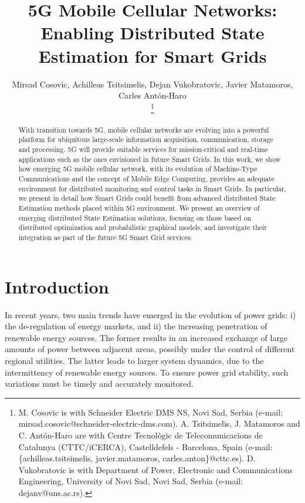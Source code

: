 \documentclass[journal]{IEEEtran}
\begin{document}
\title{5G Mobile Cellular Networks: Enabling Distributed State Estimation for Smart Grids}

\author{Mirsad Cosovic,
		Achilleas Tsitsimelis,
        Dejan Vukobratovic,
        Javier Matamoros,
       	Carles Ant\'on-Haro%
       	
\thanks{M. Cosovic is with Schneider Electric DMS NS, Novi Sad, Serbia (e-mail: mirsad.cosovic@schneider-electric-dms.com).  A. Tsitsimelis, J. Matamoros and C. Ant\'on-Haro are with Centre Tecnol\`ogic de Telecomunicacions de Catalunya (CTTC/iCERCA), Castelldefels - Barcelona, Spain (e-mail: \{achilleas.tsitsimelis, javier.matamoros, carles.anton\}@cttc.es). D. Vukobratovic is with Department of Power, Electronic and Communications Engineering, University of Novi Sad, Novi Sad, Serbia (e-mail: dejanv@uns.ac.rs).} }

\maketitle


\begin{abstract}
With transition towards 5G, mobile cellular networks are evolving into a powerful platform for ubiquitous large-scale information acquisition, communication, storage and processing. 5G will provide suitable services for mission-critical and real-time applications such as the ones envisioned in future Smart Grids. In this work, we show how emerging 5G mobile cellular network, with its evolution of Machine-Type Communications and the concept of Mobile Edge Computing, provides an adequate environment for distributed monitoring and control tasks in Smart Grids. In particular, we present in detail how Smart Grids could benefit from advanced distributed State Estimation methods placed within 5G environment. We present an overview of emerging distributed State Estimation solutions, focusing on those based on distributed optimization and probabilistic graphical models, and investigate their integration as part of the future 5G Smart Grid services.
\end{abstract}

\IEEEpeerreviewmaketitle
\vspace{-0.35cm}
\section{Introduction}

In recent years, two main trends have emerged in the evolution of power grids: i) the de-regulation of energy markets, and ii) the increasing penetration of renewable energy sources. The former results in an increased exchange of large amounts of power between adjacent areas, possibly under the control of different regional utilities. The latter leads to larger system dynamics, due to the intermittency of renewable energy sources. To ensure power grid stability, such variations must be timely and accurately monitored.
  
\end{document}
